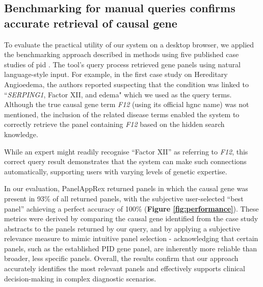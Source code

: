 \subsection{Benchmarking for manual queries confirms accurate retrieval of causal gene}
\noindent
To evaluate the practical utility of our system on a desktop browser, we applied the benchmarking approach described in methods using five published case studies of \ac{pid}
\cite{arruda_genetic_2015, 
mcaleer_severe_2015,
verhoeven_hematopoietic_2022,
magerus-chatinet_autoimmune_2013,
sharfe_fatal_2014}. %
The tool's query process retrieved gene panels using natural language-style input. 
For example, in the first case study on Hereditary Angioedema, the authors reported suspecting that the condition was linked to ``\textit{SERPING1}, Factor XII, and edema" which we used as the query terms. 
Although the true causal gene term \textit{F12} (using its official \ac{hgnc} name) was not mentioned, the inclusion of the related disease terms enabled the system to correctly retrieve the panel containing \textit{F12} based on the hidden search knowledge.

While an expert might readily recognise ``Factor XII'' as referring to \textit{F12}, this correct query result demonstrates that the system can make such connections automatically, supporting users with varying levels of genetic expertise.

In our evaluation, PanelAppRex returned panels in which the causal gene was present in 93\% of all returned panels, with the subjective user-selected ``best panel'' achieving a perfect accuracy of 100\% 
(\textbf{Figure \ref{fig:performance}}).
 These metrics were derived by comparing the causal gene identified from the case study abstracts to the panels returned by our query, and by applying a subjective relevance measure to mimic intuitive panel selection - acknowledging that certain panels, such as the established PID gene panel, are inherently more reliable than broader, less specific panels. Overall, the results confirm that our approach accurately identifies the most relevant panels and effectively supports clinical decision-making in complex diagnostic scenarios.

